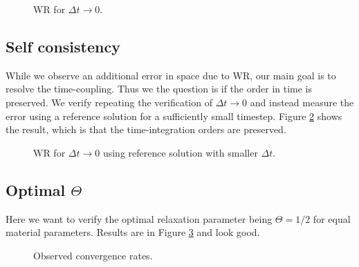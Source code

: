 \documentclass[a4paper,10pt]{article}
\begin{document}
\begin{figure}[ht!]
\label{FIG WR DX}
\caption{WR for $\Delta t \rightarrow 0$.}
\end{figure}
% 
\FloatBarrier
\subsection{Self consistency}
While we observe an additional error in space due to WR, our main goal is to resolve the time-coupling. Thus we the question is if the order in time is preserved. We verify repeating the verification of $\Delta t \rightarrow 0$ and instead measure the error using a reference solution for a sufficiently small timestep. Figure \ref{FIG WR CONS} shows the result, which is that the time-integration orders are preserved.

\begin{figure}[ht!]
\label{FIG WR CONS}
\caption{WR for $\Delta t \rightarrow 0$ using reference solution with smaller $\Delta t$.}
\end{figure}
% 
\FloatBarrier
\subsection{Optimal $\Theta$}
Here we want to verify the optimal relaxation parameter being $\Theta = 1/2$ for equal material parameters. Results are in Figure \ref{FIG WR CONV} and look good.

\begin{figure}[ht!]
\label{FIG WR CONV}
\caption{Observed convergence rates.}
\end{figure}
\end{document}
